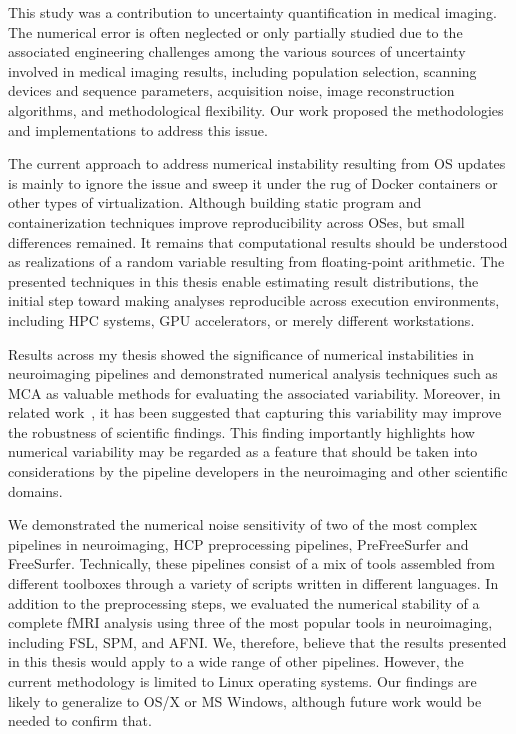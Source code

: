 This study was a contribution to uncertainty quantification in medical imaging.
The numerical error is often neglected or only partially studied due to the associated engineering challenges among
the various sources of uncertainty involved in medical imaging results, including population selection,
scanning devices and sequence parameters, acquisition noise, image reconstruction algorithms, and methodological flexibility.
Our work proposed the methodologies and implementations to address this issue.

The current approach to address numerical instability resulting from OS
updates is mainly to ignore the issue and sweep it under the rug of %
Docker containers or other types of virtualization. 
Although building static program and containerization techniques improve
reproducibility across OSes, but small differences remained.
It remains that computational results should be understood as realizations of a random variable resulting
from floating-point arithmetic. The presented techniques in this thesis enable estimating
result distributions, the initial step toward making analyses reproducible across
execution environments, including HPC systems, GPU accelerators, or merely
different workstations.

Results across my thesis showed the significance of numerical instabilities in neuroimaging pipelines
and demonstrated numerical analysis techniques such as MCA as valuable methods for evaluating the associated variability. 
Moreover, in related work~\cite{kiar2020numerical}, it has been suggested that capturing this variability may improve the robustness of scientific
findings. This finding importantly highlights how numerical variability may be regarded as a feature that should be
taken into considerations by the pipeline developers in the neuroimaging and other scientific domains.

We demonstrated the numerical noise sensitivity of two of the most complex pipelines in neuroimaging,
HCP preprocessing pipelines, PreFreeSurfer and FreeSurfer. Technically, these pipelines consist of a mix of tools
assembled from different toolboxes through a variety of scripts written in different languages. In addition to the preprocessing steps,
we evaluated the numerical stability of a complete fMRI analysis using three of the most popular tools in neuroimaging, including FSL, SPM, and AFNI.
We, therefore, believe that the results presented in this thesis would apply to a wide range of other pipelines. 
However, the current methodology is limited to Linux operating systems. 
Our findings are likely to generalize to OS/X or MS Windows, although future work would be needed to confirm that.


